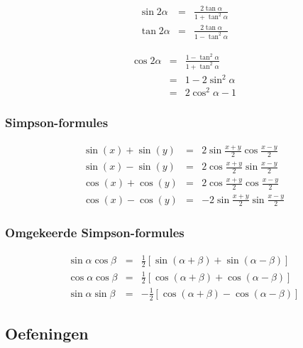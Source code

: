 \begin{minipage}[b]{0.5\linewidth}
\begin{eqnarray*}
\sin2\alpha &=& \frac{2\tan\alpha}{1+\tan^2\alpha}\\
\tan2\alpha &=& \frac{2\tan \alpha}{1-\tan^2\alpha}
\end{eqnarray*}
\end{minipage}
\hspace{0.5cm}
\begin{minipage}[b]{0.5\linewidth}
\begin{eqnarray*}
\cos2\alpha &=& \frac{1-\tan^2\alpha}{1+\tan^2\alpha}\\
&=& 1-2\sin^2\alpha\\
&=& 2\cos^2\alpha-1
\end{eqnarray*}
\end{minipage}

\subsubsection{Simpson-formules}

\begin{eqnarray*}
\sin(x)+\sin(y)&=&2\sin\frac{x+y}{2}\cos\frac{x-y}{2}\\
\sin(x)-\sin(y)&=&2\cos\frac{x+y}{2}\sin\frac{x-y}{2}\\
\cos(x)+\cos(y)&=&2\cos\frac{x+y}{2}\cos\frac{x-y}{2}\\
\cos(x)-\cos(y)&=&-2\sin\frac{x+y}{2}\sin\frac{x-y}{2}
\end{eqnarray*}

\subsubsection{Omgekeerde Simpson-formules}

\begin{eqnarray*}
\sin\alpha\cos\beta&=&\frac{1}{2}\left[\sin(\alpha + \beta)+\sin(\alpha - \beta)\right]\\
\cos\alpha\cos\beta&=&\frac{1}{2}\left[\cos(\alpha + \beta)+\cos(\alpha - \beta)\right]\\
\sin\alpha\sin\beta&=&-\frac{1}{2}\left[\cos(\alpha + \beta)-\cos(\alpha - \beta)\right]
\end{eqnarray*}

\subsection{Oefeningen}

